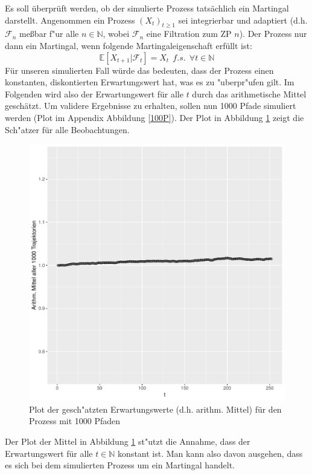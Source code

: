 \documentclass[10pt,a4paper]{report}\usepackage[]{graphicx}\usepackage[]{color}
\makeatletter
\def\maxwidth{ %
  \ifdim\Gin@nat@width>\linewidth
    \linewidth
  \else
    \Gin@nat@width
  \fi
}
\makeatother
\begin{document}
Es soll überprüft werden, ob der simulierte Prozess tatsächlich ein Martingal darstellt. Angenommen ein Prozess $(X_t)_{t\geq 1}$ sei integrierbar und adaptiert (d.h. $\mathcal{F}_n$ meßbar f"ur alle $n \in \mathbb{N}$, wobei $\mathcal{F}_n$ eine Filtration zum ZP $n$). Der Prozess nur dann ein Martingal, wenn folgende Martingaleigenschaft erfüllt ist:
\[ \mathbb{E}[X_{t+1}| \mathcal{F}_t]=X_t \ \ f.s.\ \ \forall t \in \mathbb{N}\]
Für unseren simulierten Fall würde das bedeuten, dass der Prozess einen konstanten, diskontierten Erwartungswert hat, was es zu "uberpr"ufen gilt. Im Folgenden wird also der Erwartungswert für alle $t$ durch das arithmetische Mittel geschätzt. Um validere Ergebnisse zu erhalten, sollen nun 1000 Pfade simuliert werden (Plot im Appendix Abbildung \ref{100P}). Der Plot in Abbildung \ref{EWfig} zeigt die Sch"atzer für alle Beobachtungen. 

\begin{figure}[H]

\includegraphics[width=\maxwidth]{figure/unnamed-chunk-15-1} 

\caption{Plot der gesch"atzten Erwartungswerte (d.h. arithm. Mittel) für den Prozess mit 1000 Pfaden}
\label{EWfig}
\end{figure}

Der Plot der Mittel in Abbildung \ref{EWfig} st"utzt die Annahme, dass der Erwartungswert für alle $t \in \mathbb{N}$ konstant ist. Man kann also davon ausgehen, dass es sich bei dem simulierten Prozess um ein Martingal handelt. 
\end{document}
